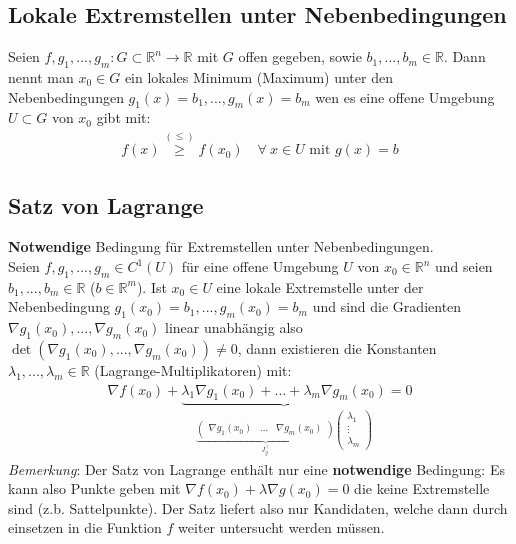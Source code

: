 \documentclass[11pt,a4paper]{book}
\newcommand {\R}	{\mathbb{R}}
\newcommand {\Rn}	{\mathbb{R}^n}
\newcommand {\Rm}	{\mathbb{R}^m}
\newcommand{\1}    	{\mathbbm{1}}
\newcommand{\mitt}	{\textrm{ mit }}
\newcommand{\Bemerkung}	{\noindent\textit{Bemerkung}: }
\begin{document}
\subsection{Lokale Extremstellen unter Nebenbedingungen}
Seien \(f,g_1,...,g_m : G \subset \Rn \rightarrow \R\) mit \(G\) offen gegeben, sowie \(b_1, ..., b_m \in \R\). Dann nennt man \(x_0 \in G\) ein lokales Minimum (Maximum) unter den Nebenbedingungen \(g_1(x) = b_1, ..., g_m(x) = b_m\) wen es eine offene Umgebung \(U \subset G\) von \(x_0\) gibt mit:
\begin{align*}
	f(x) \stackrel{(\leqslant)}{\geqslant} f(x_0) \quad
	\forall~ x \in U \mitt g(x) = b
\end{align*}


\subsection{Satz von Lagrange}
\textbf{Notwendige} Bedingung für Extremstellen unter Nebenbedingungen.\\
Seien \(f,g_1, ..., g_m \in C^1(U)\) für eine offene Umgebung \(U\) von \(x_0 \in \Rn\) und seien \(b_1, ..., b_m \in \R\) (\(b \in \Rm\)). Ist \(x_0 \in U\) eine lokale Extremstelle unter der Nebenbedingung \(g_1(x_0)=b_1, ..., g_m(x_0)=b_m\) und sind die Gradienten \(\nabla g_1(x_0), ..., \nabla g_m(x_0)\) linear unabhängig also \(\det\left( \nabla g_1(x_0), ..., \nabla g_m(x_0) \right) \neq 0\), dann existieren die Konstanten \(\lambda_1, ..., \lambda_m \in \R\) (Lagrange-Multiplikatoren) mit:
\begin{align*}
	\nabla f(x_0) + \underbrace{
		\lambda_1 \nabla g_1(x_0) + ... + \lambda_m \nabla g_m(x_0)
		}_{
			\underbrace{
				\left( \begin{array}{ccc}
					\nabla g_1(x_0) & \hdots & \nabla g_m(x_0)
				\end{array} \right)
			}_{J_g^\top}
			\left( \begin{array}{c}
				\lambda_1 \\
				\vdots \\
				\lambda_m
			\end{array} \right)
		} = 0
\end{align*}
\Bemerkung Der Satz von Lagrange enthält nur eine \textbf{notwendige} Bedingung: Es kann also Punkte geben mit \(\nabla f(x_0) + \lambda \nabla g(x_0) = 0\) die keine Extremstelle sind (z.b. Sattelpunkte). Der Satz liefert also nur Kandidaten, welche dann durch einsetzen in die Funktion \(f\) weiter untersucht werden müssen.\\
\end{document}
